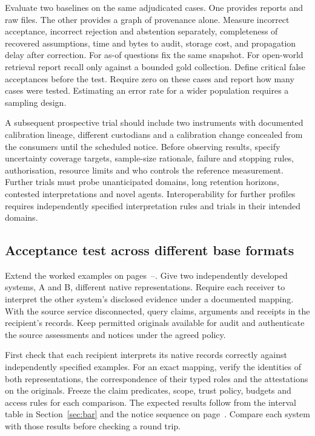 \documentclass[11pt,a4paper]{article}
\begin{document}
Evaluate two baselines on the same adjudicated cases. One provides reports and raw files. The other provides a graph of provenance alone. Measure incorrect acceptance, incorrect rejection and abstention separately, completeness of recovered assumptions, time and bytes to audit, storage cost, and propagation delay after correction. For as-of questions fix the same snapshot. For open-world retrieval report recall only against a bounded gold collection. Define critical false acceptances before the test. Require zero on these cases and report how many cases were tested. Estimating an error rate for a wider population requires a sampling design.

A subsequent prospective trial should include two instruments with documented calibration lineage, different custodians and a calibration change concealed from the consumers until the scheduled notice. Before observing results, specify uncertainty coverage targets, sample-size rationale, failure and stopping rules, authorisation, resource limits and who controls the reference measurement. Further trials must probe unanticipated domains, long retention horizons, contested interpretations and novel agents. Interoperability for further profiles requires independently specified interpretation rules and trials in their intended domains.

\clearpage
{}
\subsection*{Acceptance test across different base formats}\label{sec:trial}
Extend the worked examples on pages~\pageref{sec:rivals}--\pageref{sec:bar}. Give two independently developed systems, A and B, different native representations. Require each receiver to interpret the other system's disclosed evidence under a documented mapping. With the source service disconnected, query claims, arguments and receipts in the recipient's records. Keep permitted originals available for audit and authenticate the source assessments and notices under the agreed policy.

First check that each recipient interprets its native records correctly against independently specified examples. For an exact mapping, verify the identities of both representations, the correspondence of their typed roles and the attestations on the originals. Freeze the claim predicates, scope, trust policy, budgets and access rules for each comparison. The expected results follow from the interval table in Section~\ref{sec:bar} and the notice sequence on page~\pageref{sec:rivals}. Compare each system with those results before checking a round trip.
\end{document}
